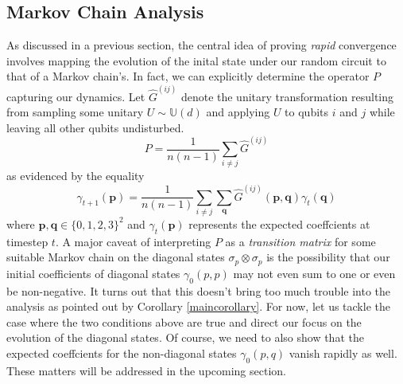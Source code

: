 \documentclass[12pt]{amsart}
\theoremstyle{definition}
\theoremstyle{remark}
\numberwithin{equation}{section}
\theoremstyle{remark}
\begin{document}
\subsection{Markov Chain Analysis}
As discussed in a previous section, the central idea of proving \emph{rapid} convergence involves mapping the evolution of the inital state under our random circuit to that of a Markov chain's. In fact, we can explicitly determine the operator $P$ capturing our dynamics. Let $\widehat{G}^{(ij)}$ denote the unitary transformation resulting from sampling some unitary $U \sim \mathbb{U}(d)$ and applying $U$ to qubits $i$ and $j$ while leaving all other qubits undisturbed.
%
\begin{equation} \label{schemechain}
P = \frac{1}{n(n-1)}\sum_{i \neq j} \widehat{G}^{(ij)}
\end{equation}
as evidenced by the equality
\begin{equation}
  \gamma_{t+1}(\textbf{p}) = \frac{1}{n(n-1)}\sum_{i \neq j}\sum_{\textbf{q}} \widehat{G}^{(ij)}(\textbf{p},\textbf{q})\gamma_t(\textbf{q})
\end{equation}
where $\textbf{p},\textbf{q} \in \{0,1,2,3\}^2$ and $\gamma_t(\textbf{p})$ represents the expected coeffcients at timestep $t$.
%
A major caveat of interpreting $P$ as a \emph{transition matrix} for some suitable Markov chain on the diagonal states $\sigma_p \otimes \sigma_p$ is the possibility that our initial coefficients of diagonal states $\gamma_0(p,p)$ may not even sum to one or even be non-negative. It turns out that this doesn't bring too much trouble into the analysis as pointed out by Corollary \ref{maincorollary}. For now, let us tackle the case where the two conditions above are true and direct our focus on the evolution of the diagonal states. Of course, we need to also show that the expected coeffcients for the non-diagonal states $\gamma_0(p,q)$ vanish rapidly as well. These matters will be addressed in the upcoming section.
\end{document}
